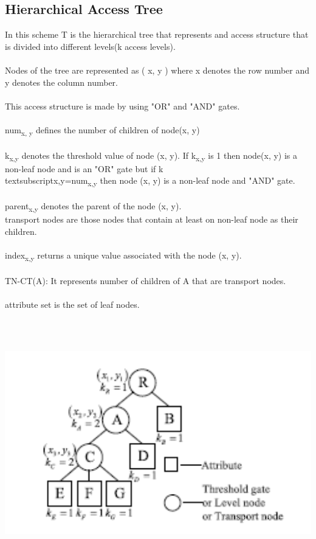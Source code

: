 \documentclass[a4paper,12pt]{article}
\begin{document}
\subsection{Hierarchical Access Tree}
In this scheme T is the hierarchical tree that represents and access structure that is divided into different levels(k access levels).\\ \\
Nodes of the tree are represented as ( x, y ) where x denotes the row number and y denotes the column number.\\ \\
This access structure is made by using "OR" and "AND" gates.\\ \\
num\textsubscript{x, y} defines the number of children of node(x, y)\\ \\
k\textsubscript{x,y} denotes the threshold value of node (x, y). If  k\textsubscript{x,y} is 1 then node(x, y) is a non-leaf node and is an "OR" gate but if k\\textsubscript{x,y}=num\textsubscript{x,y} then node (x, y) is a non-leaf node and  "AND" gate.\\ \\
parent\textsubscript{x,y} denotes the parent of the node (x, y).\\
transport nodes are those nodes that contain at least on non-leaf node as their children.\\ \\
index\textsubscript{x,y} returns a unique value associated with the node (x, y).\\ \\
TN-CT(A): It represents number of children of A that are transport nodes.\\ \\
attribute set is the set of leaf nodes.\\
\includegraphics[width=14cm,height=11.5cm]{fig18.PNG}
\end{document}
